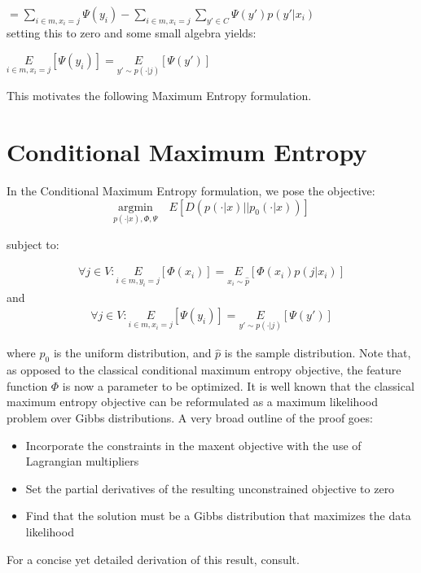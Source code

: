 \documentclass[]{article}
\begin{document}
$ = \underset{i \in m, x_i = j}{\sum} \Psi(y_i) - \underset{i \in m, x_i = j}{\sum} \sum_{y\prime \in C}\Psi(y') p(y\prime|x_i)$\\

\noindent setting this to zero and some small algebra yields:

$\underset{i \in m, x_i = j}{E}\left[\Psi(y_i)\right] = \underset{y\prime \sim p(\cdot|j)}{E}\left[\Psi(y\prime)\right]$

\noindent This motivates the following Maximum Entropy formulation.

\section{Conditional Maximum Entropy}

In the Conditional Maximum Entropy formulation, we pose the objective:\\

\begin{equation}\underset{p(\cdot | x), \Phi, \Psi}{\text{argmin}} \quad E\left[ D(p(\cdot|x) \vert \vert  p_0(\cdot|x))\right] \label{eq:maxent}
\end{equation}

\noindent subject to:

\begin{align}
	\forall j \in V: \underset{i \in m, y_i = j}{E}\left[\Phi(x_i)\right] = \underset{x_i \sim \hat{p}}{E}\left[\Phi(x_i) p(j|x_i)\right]
\end{align}
\noindent and
\begin{align}
	\forall j \in V: \underset{i \in m, x_i = j}{E}\left[\Psi(y_i)\right] = \underset{y\prime \sim p(\cdot|j)}{E}\left[\Psi(y\prime)\right]
\end{align}

\noindent where $p_0$ is the uniform distribution, and $\hat{p}$ is the sample distribution. Note that, as opposed to the classical conditional maximum entropy objective, the feature function $\Phi$ is now a parameter to be optimized. It is well known that the classical maximum entropy objective can be reformulated as a maximum likelihood problem over Gibbs distributions. A very broad outline of the proof goes:
\begin{itemize}
\item Incorporate the constraints in the maxent objective with the use of Lagrangian multipliers
\item Set the partial derivatives of the resulting unconstrained objective to zero
\item Find that the solution must be a Gibbs distribution that maximizes the data likelihood  
\end{itemize}
For a concise yet detailed derivation of this result, consult\cite{logregmaxent}.\\
\end{document}
